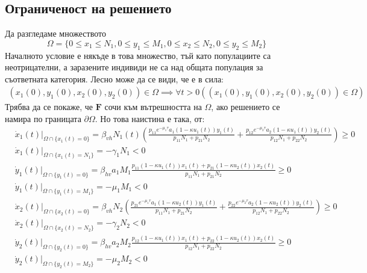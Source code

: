 \subsection{Ограниченост на решението}
Да разгледаме множеството
\begin{equation}
  \Omega = \{0 \leq x_1 \leq N_1, 0 \leq y_1 \leq M_1, 0 \leq x_2 \leq N_2, 0 \leq y_2 \leq M_2\}
\end{equation}
Началното условие е някъде в това множество, тъй като популациите са неотрицателни, а заразените индивиди не са над общата популация за съответната категория. Лесно може да се види, че е в сила:
\begin{align}
  (x_1(0), y_1(0), x_2(0), y_2(0)) \in \Omega \implies \forall{t>0}\left((x_1(0), y_1(0), x_2(0), y_2(0)) \in \Omega\right)
\end{align}
Трябва да се покаже, че $\mathbf{F}$ сочи към вътрешността на $\Omega$, ако решението се намира по границата $\partial \Omega$. Но това наистина е така, от:
\begin{align*}
  &\dot{x}_1(t)\vert_{\Omega \cap \{x_1(t)=0\}} = \beta_{vh} N_1(t) \left(\frac{p_{11} e^{-\mu_1 \tau} a_1 (1-\kappa u_1(t)) y_1(t)}{p_{11} N_1 + p_{21} N_2} + \frac{p_{12} e^{-\mu_2 \tau} a_2 (1-\kappa u_1(t)) y_2(t)}{p_{12} N_1 + p_{22} N_2 }\right) \geq 0 \\
  &\dot{x}_1(t)\vert_{\Omega \cap \{x_1(t)=N_1\}} = - \gamma_1 N_1 < 0 \\
  &\dot{y}_1(t)\vert_{\Omega \cap \{y_1(t)=0\}} = \beta_{hv} a_1 M_1 \frac{p_{11} (1-\kappa u_1(t)) x_1(t) + p_{21} (1-\kappa u_2(t)) x_2(t)}{p_{11} N_1 + p_{21} N_2} \geq 0 \\
  &\dot{y}_1(t)\vert_{\Omega \cap \{y_1(t)=M_1\}} = - \mu_1 M_1 < 0 \\
  &\dot{x}_2(t)\vert_{\Omega \cap \{x_2(t)=0\}} = \beta_{vh} N_2 \left(\frac{p_{21} e^{-\mu_1 \tau} a_1 (1-\kappa u_2(t)) y_1(t)}{p_{11} N_1 + p_{21} N_2} + \frac{p_{22} e^{-\mu_2 \tau} a_2 (1-\kappa u_2(t)) y_2(t)}{p_{12} N_1 + p_{22} N_2}\right) \geq 0 \\
  &\dot{x}_2(t)\vert_{\Omega \cap \{x_2(t)=N_2\}} = - \gamma_2 N_2 < 0 \\
  &\dot{y}_2(t)\vert_{\Omega \cap \{y_2(t)=0\}} = \beta_{hv} a_2 M_2 \frac{p_{12} (1-\kappa u_1(t)) x_1(t) + p_{22} (1-\kappa u_2(t)) x_2(t)}{p_{12} N_1 + p_{22} N_2} \geq 0 \\
  &\dot{y}_2(t)\vert_{\Omega \cap \{y_2(t)=M_2\}} = - \mu_2 M_2 < 0
\end{align*}

